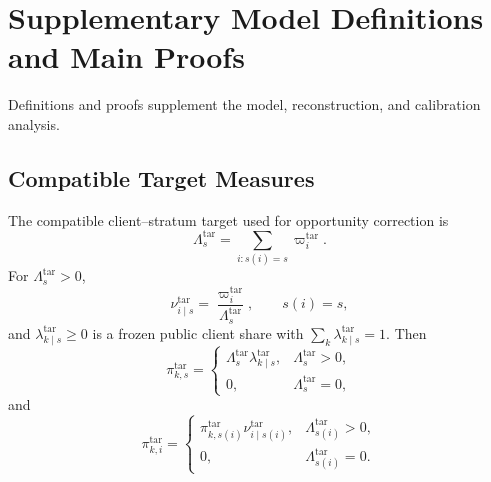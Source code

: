\appendices
\section{Supplementary Model Definitions and Main Proofs}
Definitions and proofs supplement the model, reconstruction, and calibration analysis.

\subsection{Compatible Target Measures}

The compatible client--stratum target used for opportunity correction is
\begin{equation}
    \Lambda_s^{\mathrm{tar}}
    =
    \sum_{i:s(i)=s}\varpi_i^{\mathrm{tar}}.
    \label{eq:target_stratum_mass}
\end{equation}
For $\Lambda_s^{\mathrm{tar}}>0$,
\begin{equation}
    \nu^{\mathrm{tar}}_{i\mid s}
    =
    \frac{\varpi_i^{\mathrm{tar}}}
         {\Lambda_s^{\mathrm{tar}}},
    \qquad s(i)=s,
    \label{eq:target_conditional_atomic}
\end{equation}
and $\lambda^{\mathrm{tar}}_{k\mid s}\ge0$ is a frozen public client share
with $\sum_k\lambda^{\mathrm{tar}}_{k\mid s}=1$.  Then
\begin{equation}
 \pi^{\mathrm{tar}}_{k,s}
 =
 \begin{cases}
 \Lambda_s^{\mathrm{tar}}\lambda^{\mathrm{tar}}_{k\mid s},
 & \Lambda_s^{\mathrm{tar}}>0,\\
 0, & \Lambda_s^{\mathrm{tar}}=0,
 \end{cases}
 \label{eq:target_ks_mass}
\end{equation}
and
\begin{equation}
 \pi^{\mathrm{tar}}_{k,i}
 =
 \begin{cases}
 \pi^{\mathrm{tar}}_{k,s(i)}
 \nu^{\mathrm{tar}}_{i\mid s(i)},
 & \Lambda_{s(i)}^{\mathrm{tar}}>0,\\
 0, & \Lambda_{s(i)}^{\mathrm{tar}}=0.
 \end{cases}
 \label{eq:target_ki_mass}
\end{equation}

